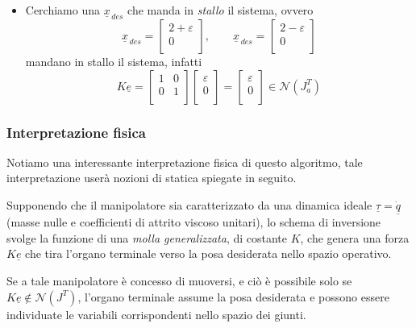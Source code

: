 \begin{itemize}
	\item Cerchiamo una $\underline{x}_{\,des}$ che manda in \emph{stallo} il sistema, ovvero
	\begin{equation*}
		\underline{x}_{\,des} =
		\begin{bmatrix}
			2+\varepsilon \\
			0 \\
		\end{bmatrix},
		\qquad 
		\underline{x}_{\,des} =
		\begin{bmatrix}
			2-\varepsilon \\
			0 \\
		\end{bmatrix}
	\end{equation*}
	mandano in stallo il sistema, infatti
	\begin{equation*}
		K \underline{e} = 
		\begin{bmatrix}
			1 & 0 \\
			0 & 1 \\
		\end{bmatrix}
		\begin{bmatrix}
			\varepsilon \\
			0 \\
		\end{bmatrix}
		=
		\begin{bmatrix}
			\varepsilon \\
			0 \\
		\end{bmatrix}
		\in\mathcal{N}(J_a^T)
	\end{equation*}
\end{itemize}

\subsubsection{Interpretazione fisica}
Notiamo una interessante interpretazione fisica di questo algoritmo, tale interpretazione userà nozioni di statica spiegate in seguito. 

Supponendo che il manipolatore sia caratterizzato da una dinamica ideale $\underline{\tau} = \underline{\dot{q}}$ (masse nulle e coefficienti di attrito viscoso unitari), lo schema di inversione svolge la funzione di una \emph{molla generalizzata}, di costante $K$, che genera una forza $K \underline{e}$ che tira l'organo terminale verso la posa desiderata nello spazio operativo.

Se a tale manipolatore è concesso di muoversi, e ciò è possibile solo se $K\underline{e} \not \in \mathcal{N}(J^T)$, l'organo terminale assume la posa desiderata e possono essere individuate le variabili corrispondenti nello spazio dei giunti.

